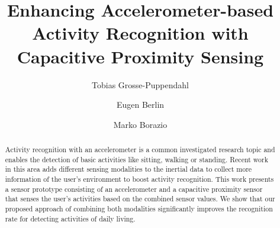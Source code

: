 \documentclass[runningheads,a4paper]{llncs}
\begin{document}
\mainmatter  %

\title{Enhancing Accelerometer-based Activity Recognition with Capacitive Proximity Sensing}


\author{Tobias Grosse-Puppendahl \and Eugen Berlin \and Marko Borazio }





\maketitle
\begin{abstract}
Activity recognition with an accelerometer is a common investigated research topic and enables the detection of basic activities like sitting, walking or standing. Recent work in this area adds different sensing modalities to the inertial data to collect more information of the user's environment to boost activity recognition. This work presents a sensor prototype consisting of an accelerometer and a capacitive proximity sensor that senses the user's activities based on the combined sensor values. We show that our proposed approach of combining both modalities significantly improves the recognition rate for detecting activities of daily living.
\end{abstract}
\end{document}
